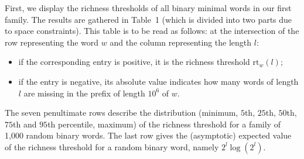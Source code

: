 \documentclass{template_arxiv}
\numberwithin{equation}{section}
\newcommand{\rt}{\mathrm{rt}}
\begin{document}
First, we display the richness thresholds of all binary minimal words in our first family.
 The results are gathered in Table~1 (which is divided into two parts due to space constraints).
 This table is to be read as follows: at the intersection of the row representing the word $w$ and the column representing the length $l$:
\begin{itemize}
\vspace{-0.1cm}\item[-] if the corresponding entry is positive, it is the richness threshold $\rt_w(l)$;
\vspace{-0.1cm}\item[-] if the entry is negative, its absolute value indicates how many words of length $l$ are missing in the prefix of length $10^6$ of $w$.
\end{itemize}
\vspace{-0.1cm}The seven penultimate rows describe the distribution (minimum, $5$th, $25$th, $50$th, $75$th and $95$th percentile, maximum) of the richness threshold for a family of 1,000 random binary words.
The last row gives the (asymptotic) expected value of the richness threshold for a  random binary word, namely  $2^l\log(2^l)$.


\bigskip

\end{document}

